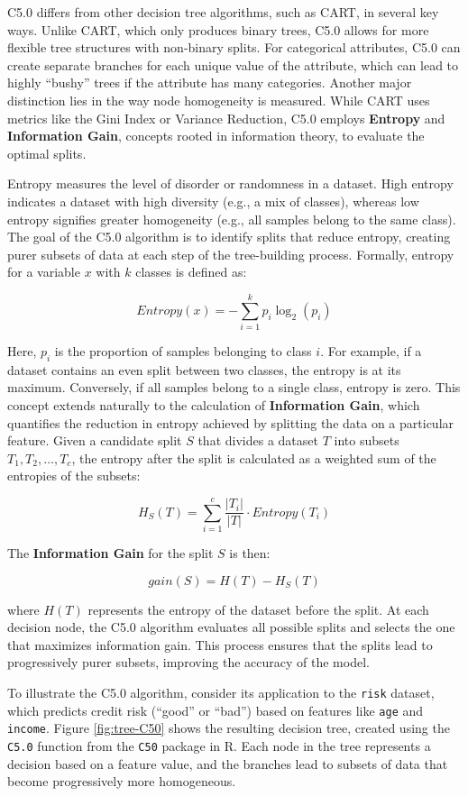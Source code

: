 \documentclass[
]{book}
\newcommand{\passthrough}[1]{#1}
\theoremstyle{definition}
\theoremstyle{definition}
\theoremstyle{definition}
\theoremstyle{definition}
\theoremstyle{remark}
\begin{document}
C5.0 differs from other decision tree algorithms, such as CART, in several key ways. Unlike CART, which only produces binary trees, C5.0 allows for more flexible tree structures with non-binary splits. For categorical attributes, C5.0 can create separate branches for each unique value of the attribute, which can lead to highly ``bushy'' trees if the attribute has many categories. Another major distinction lies in the way node homogeneity is measured. While CART uses metrics like the Gini Index or Variance Reduction, C5.0 employs \textbf{Entropy} and \textbf{Information Gain}, concepts rooted in information theory, to evaluate the optimal splits.

Entropy measures the level of disorder or randomness in a dataset. High entropy indicates a dataset with high diversity (e.g., a mix of classes), whereas low entropy signifies greater homogeneity (e.g., all samples belong to the same class). The goal of the C5.0 algorithm is to identify splits that reduce entropy, creating purer subsets of data at each step of the tree-building process. Formally, entropy for a variable \(x\) with \(k\) classes is defined as:

\[
Entropy(x) = - \sum_{i=1}^k p_i \log_2(p_i)
\]

Here, \(p_i\) is the proportion of samples belonging to class \(i\). For example, if a dataset contains an even split between two classes, the entropy is at its maximum. Conversely, if all samples belong to a single class, entropy is zero. This concept extends naturally to the calculation of \textbf{Information Gain}, which quantifies the reduction in entropy achieved by splitting the data on a particular feature. Given a candidate split \(S\) that divides a dataset \(T\) into subsets \(T_1, T_2, \dots, T_c\), the entropy after the split is calculated as a weighted sum of the entropies of the subsets:

\[
H_S(T) = \sum_{i=1}^c \frac{|T_i|}{|T|} \cdot Entropy(T_i)
\]

The \textbf{Information Gain} for the split \(S\) is then:

\[
gain(S) = H(T) - H_S(T)
\]

where \(H(T)\) represents the entropy of the dataset before the split. At each decision node, the C5.0 algorithm evaluates all possible splits and selects the one that maximizes information gain. This process ensures that the splits lead to progressively purer subsets, improving the accuracy of the model.

To illustrate the C5.0 algorithm, consider its application to the \passthrough{\lstinline!risk!} dataset, which predicts credit risk (``good'' or ``bad'') based on features like \passthrough{\lstinline!age!} and \passthrough{\lstinline!income!}. Figure \ref{fig:tree-C50} shows the resulting decision tree, created using the \passthrough{\lstinline!C5.0!} function from the \passthrough{\lstinline!C50!} package in R. Each node in the tree represents a decision based on a feature value, and the branches lead to subsets of data that become progressively more homogeneous.
\end{document}
